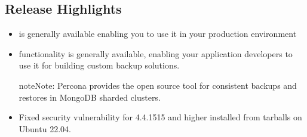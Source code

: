 \documentclass[letterpaper,10pt,english]{sphinxmanual}
\begin{document}
\subsection{Release Highlights}
\label{\detokenize{release_notes/4.4.17-17:release-highlights}}\begin{itemize}
\item {} 
\sphinxAtStartPar
{\hyperref[\detokenize{kmip:kmip}]{}} is generally available enabling you to use it in your production environment

\item {} 
\sphinxAtStartPar
{\hyperref[\detokenize{backup-cursor:backup-cursor}]{}} functionality is generally available, enabling your application developers to use it for building custom backup solutions.

\begin{sphinxadmonition}{note}{Note:}
\sphinxAtStartPar
Percona provides  \sphinxhyphen{} the open source tool for consistent backups and restores in MongoDB sharded clusters.
\end{sphinxadmonition}

\item {} 
\sphinxAtStartPar
Fixed security vulnerability  for  4.4.15\sphinxhyphen{}15 and higher installed from tarballs on Ubuntu 22.04.

\end{itemize}
\end{document}
